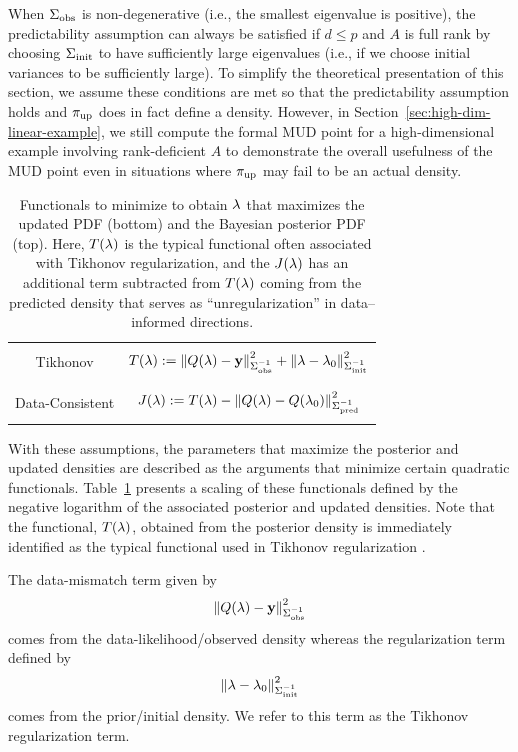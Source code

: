 When $\Sigma_\text{obs}$ is non-degenerative (i.e., the smallest eigenvalue is positive), the predictability assumption can always be satisfied if $d\leq p$ and $A$ is full rank by choosing $\Sigma_\text{init}$ to have sufficiently large eigenvalues (i.e., if we choose initial variances to be sufficiently large).
To simplify the theoretical presentation of this section, we assume these conditions are met so that the predictability assumption holds and $\operatorname*{\pi_{up}}$ does in fact define a density.
However, in Section~\ref{sec:high-dim-linear-example}, we still compute the formal MUD point for a high-dimensional example involving rank-deficient $A$ to demonstrate the overall usefulness of the MUD point even in situations where $\operatorname*{\pi_{up}}$ may fail to be an actual density.


\begin{table}
\centering
\begin{tabular}{|c|c|}
\hline
  & \\
  Tikhonov & $T(\lambda):=\left\Vert Q(\lambda)-\mathbf{y}\right\Vert_{\Sigma_\text{obs}^{-1}}^2 +
      \left\Vert\lambda-\lambda_0\right\Vert_{\Sigma_\text{init}^{-1}}^2$
  \\ & \\ \hline & \\
  Data-Consistent & $J(\lambda):=T(\lambda) - \left\Vert Q(\lambda)-Q(\lambda_0)\right\Vert_{\Sigma_\text{pred}^{-1}}^2$
  \\ & \\
  \hline
\end{tabular}
\caption{Functionals to minimize to obtain $\lambda$ that maximizes  the updated PDF (bottom) and the Bayesian posterior PDF (top).
Here, $T(\lambda)$ is the typical functional often associated with Tikhonov regularization, and the $J(\lambda)$ has an additional term subtracted from $T(\lambda)$ coming from the predicted density that serves as ``unregularization'' in data--informed directions.}
  \label{tab:func_comparisons}
\end{table}


With these assumptions, the parameters that maximize the posterior and updated densities are described as the arguments that minimize certain quadratic functionals.
Table~\ref{tab:func_comparisons} presents a scaling of these functionals defined by the negative logarithm of the associated posterior and updated densities.
Note that the functional, $T(\lambda)$, obtained from the posterior density is immediately identified as the typical functional used in Tikhonov regularization \citep{Tarantola_book}.

The data-mismatch term given by
\begin{equation*}
	\left\Vert Q(\lambda)-\mathbf{y}\right\Vert_{\Sigma_\text{obs}^{-1}}^2
\end{equation*}
comes from the data-likelihood/observed density whereas the regularization term defined by
\begin{equation*}
	 \left\Vert\lambda-\lambda_0\right\Vert_{\Sigma_\text{init}^{-1}}^2
\end{equation*}
comes from the prior/initial density.
We refer to this term as the Tikhonov regularization term.

